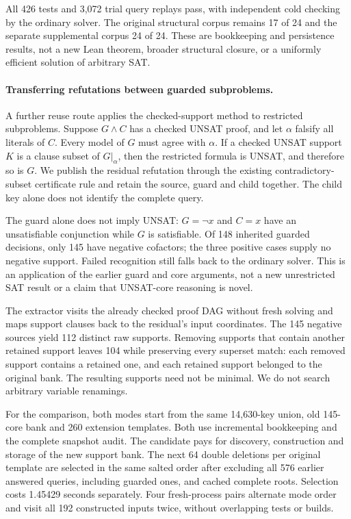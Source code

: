 \documentclass[11pt,a4paper]{article}
\numberwithin{equation}{section}
\theoremstyle{plain}
\theoremstyle{definition}
\theoremstyle{remark}
\begin{document}
All 426 tests and 3,072 trial query replays pass, with independent cold checking
by the ordinary solver. The original structural corpus remains 17 of 24 and
the separate supplemental corpus 24 of 24. These are bookkeeping and persistence
results, not a new Lean theorem, broader structural closure, or a uniformly
efficient solution of arbitrary SAT.

\paragraph{Transferring refutations between guarded subproblems.}
A further reuse route applies the checked-support method to restricted
subproblems. Suppose $G\land C$ has a checked UNSAT proof, and let $\alpha$
falsify all literals of $C$. Every model of $G$ must agree with $\alpha$.
If a checked UNSAT support $K$ is a clause subset of $G|_\alpha$, then the
restricted formula is UNSAT, and therefore so is $G$. We publish the residual
refutation through the existing contradictory-subset certificate rule and
retain the source, guard and child together. The child key alone does not
identify the complete query.

The guard alone does not imply UNSAT: $G=\neg x$ and $C=x$ have an unsatisfiable
conjunction while $G$ is satisfiable. Of 148 inherited guarded decisions, only
145 have negative cofactors; the three positive cases supply no negative
support. Failed recognition still falls back to the ordinary solver. This is
an application of the earlier guard and core arguments, not a new unrestricted
SAT result or a claim that UNSAT-core reasoning is novel.

The extractor visits the already checked proof DAG without fresh solving and
maps support clauses back to the residual's input coordinates. The 145 negative
sources yield 112 distinct raw supports. Removing supports that contain another
retained support leaves 104 while preserving every superset match: each removed
support contains a retained one, and each retained support belonged to the
original bank. The resulting supports need not be minimal. We do not search
arbitrary variable renamings.

For the comparison, both modes start from the same 14,630-key union, old
145-core bank and 260 extension templates. Both use incremental bookkeeping and
the complete snapshot audit. The candidate pays for discovery, construction
and storage of the new support bank. The next 64 double deletions per original
template are selected in the same salted order after excluding all 576 earlier
answered queries, including guarded ones, and cached complete roots. Selection
costs 1.45429 seconds separately. Four fresh-process pairs alternate mode order
and visit all 192 constructed inputs twice, without overlapping tests or builds.
\end{document}
